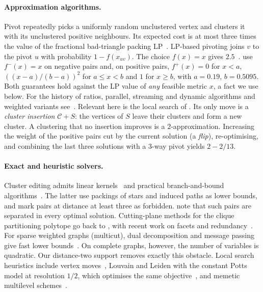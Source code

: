 \documentclass[11pt]{article}
\theoremstyle{definition}
\begin{document}
\paragraph{Approximation algorithms.}  Pivot repeatedly picks a uniformly
random unclustered vertex and clusters it with its unclustered positive
neighbours.  Its expected cost is at most three times the value of the
fractional bad-triangle packing LP~\citep{AilonCN08}.  LP-based pivoting joins
$v$ to the pivot $u$ with probability $1-f(x_{uv})$.  The choice $f(x)=x$
gives $2.5$~\citep{AilonCN08}.  \citet{ChawlaMSY15} use $f^-(x)=x$ on negative
pairs and, on positive pairs, $f^+(x)=0$ for $x<a$,
$((x-a)/(b-a))^2$ for $a\le x<b$ and $1$ for $x\ge b$, with
$a=0.19$, $b=0.5095$.  Both guarantees hold against the LP value of \emph{any}
feasible metric $x$, a fact we use below.  For the history of ratios,
parallel, streaming and dynamic algorithms and weighted variants
see~\citep{CohenAddadLPTYZ24,CaoCLLLNTVYZ25,GarciaSorianoS26,
cohenaddad2021constant,behnezhad2022almost3,DemaineEFI06}.  Relevant here is
the local search of \citet{CohenAddadLPTYZ24}.  Its only move is a
\emph{cluster insertion} $\mathcal C+S$: the vertices of $S$ leave their
clusters and form a new cluster.  A clustering that no insertion improves is a
$2$-approximation.  Increasing the weight of the positive pairs cut by the
current solution (a \emph{flip}), re-optimising, and combining the last three
solutions with a $3$-way pivot yields $2-2/13$.

\paragraph{Exact and heuristic solvers.}  Cluster editing admits linear
kernels~\citep{Guo09kernel,CaoC12kernel} and practical branch-and-bound
algorithms~\citep{BockerBK11exact,BlasiusEtAl22sea}.  The latter use packings
of stars and induced paths as lower bounds, and mark pairs at distance at
least three as forbidden.  \citet{BastosOPSMP16} note that such pairs are
separated in every optimal solution.  Cutting-plane methods for the clique
partitioning polytope go back to \citet{GrotschelW89}, with recent work on
facets and redundancy~\citep{irmai2024chorded,koshimura2022concise}.  For
sparse weighted graphs (multicut), dual decomposition and message passing
give fast lower bounds~\citep{SwobodaA17multicut,AbbasS22rama,lange2018partial}.
On complete graphs, however, the number of variables is quadratic.  Our
distance-two support removes exactly this obstacle.  Local search heuristics
include vertex moves~\citep{elsner2009bounding}, Louvain and Leiden with the
constant Potts model at resolution $1/2$, which optimises the same
objective~\citep{veldt2018lambdacc,BlondelGLL08,TraagWvE19}, and memetic
multilevel schemes~\citep{hausberger2025scc,BlasiusEtAl21kapoceHeur}.
\end{document}
